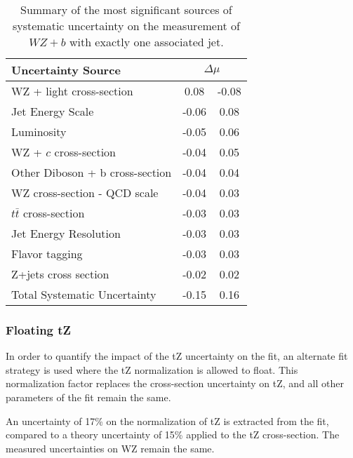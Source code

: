 \begin{table}[H]                                                                                                             
    \centering                                                                                                               
    \begin{tabular}{l|cc}
        \hline\hline
        Uncertainty Source & \multicolumn{2}{c}{$\Delta \mu$ }  \\
        \hline
        WZ + light cross-section & 0.08 & -0.08 \\
        Jet Energy Scale & -0.06 & 0.08 \\
        Luminosity & -0.05 & 0.06 \\
        WZ + $c$ cross-section & -0.04 & 0.05 \\
        Other Diboson + b cross-section & -0.04 & 0.04 \\
        WZ cross-section - QCD scale & -0.04 & 0.03 \\
        $t\bar{t}$ cross-section & -0.03 & 0.03 \\
        Jet Energy Resolution & -0.03 & 0.03 \\
        Flavor tagging & -0.03 & 0.03 \\
        Z+jets cross section & -0.02 & 0.02 \\
        \hline
        Total Systematic Uncertainty & -0.15 & 0.16 \\
        \hline\hline
  \end{tabular}
  \caption{Summary of the most significant sources of systematic uncertainty on the measurement of $WZ+b$ with exactly one associated jet.}
  \label{tab:systematics_tZ1j}
\end{table}

\subsubsection{Floating tZ}
\label{sec:float_tZ}

In order to quantify the impact of the tZ uncertainty on the fit, an alternate fit strategy is used where the tZ normalization is allowed to float. This normalization factor replaces the cross-section uncertainty on tZ, and all other parameters of the fit remain the same.

An uncertainty of 17\% on the normalization of tZ is extracted from the fit, compared to a theory uncertainty of 15\% applied to the tZ cross-section. The measured uncertainties on WZ remain the same.

